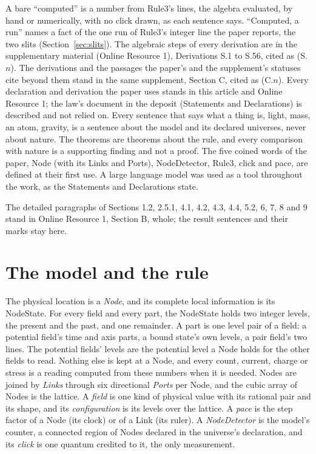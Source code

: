 \documentclass[pdflatex,sn-mathphys-num]{sn-jnl}
\theoremstyle{thmstyleone}
\theoremstyle{thmstyletwo}
\begin{document}
A bare ``computed'' is a number from Rule3's lines, the algebra evaluated, by hand or numerically, with no click drawn, as each sentence says. ``Computed, a run'' names a fact of the one run of Rule3's integer line the paper reports, the two slits (Section~\ref{sec:slits}). The algebraic steps of every derivation are in the supplementary material (Online Resource 1), Derivations S.1 to S.56, cited as (S.$n$). The derivations and the passages the paper's and the supplement's statuses cite beyond them stand in the same supplement, Section C, cited as (C.$n$). Every declaration and derivation the paper uses stands in this article and Online Resource 1; the law's document in the deposit (Statements and Declarations) is described and not relied on. Every sentence that says what a thing is, light, mass, an atom, gravity, is a sentence about the model and its declared universes, never about nature. The theorems are theorems about the rule, and every comparison with nature is a supporting finding and not a proof. The five coined words of the paper, Node (with its Links and Ports), NodeDetector, Rule3, click and pace, are defined at their first use. A large language model was used as a tool throughout the work, as the Statements and Declarations state.

The detailed paragraphs of Sections 1.2, 2.5.1, 4.1, 4.2, 4.3, 4.4, 5.2, 6, 7, 8 and 9 stand in Online Resource 1, Section B, whole; the result sentences and their marks stay here.
\section{The model and the rule}\label{sec:model}

The physical location is a \emph{Node}, and its complete local information is its NodeState. For every field and every part, the NodeState holds two integer levels, the present and the past, and one remainder. A part is one level pair of a field: a potential field's time and axis parts, a bound state's own levels, a pair field's two lines. The potential fields' levels are the potential level a Node holds for the other fields to read. Nothing else is kept at a Node, and every count, current, charge or stress is a reading computed from these numbers when it is needed. Nodes are joined by \emph{Links} through six directional \emph{Ports} per Node, and the cubic array of Nodes is the lattice. A \emph{field} is one kind of physical value with its rational pair and its shape, and its \emph{configuration} is its levels over the lattice. A \emph{pace} is the step factor of a Node (its clock) or of a Link (its ruler). A \emph{NodeDetector} is the model's counter, a connected region of Nodes declared in the universe's declaration, and its \emph{click} is one quantum credited to it, the only measurement.
\end{document}
